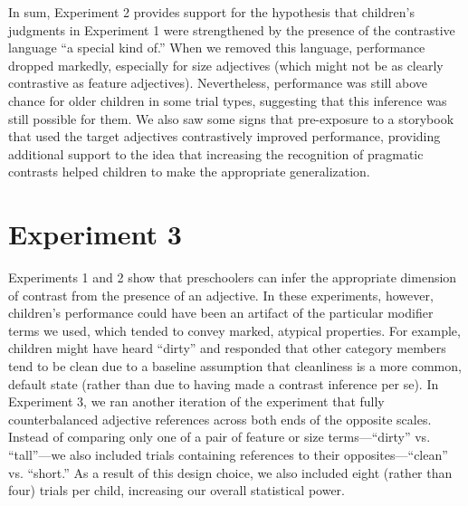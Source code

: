 \documentclass[man]{apa2}
\begin{document}

In sum, Experiment 2 provides support for the hypothesis that children's judgments in Experiment 1 were strengthened by the presence of the contrastive language ``a special kind of.'' When we removed this language, performance dropped markedly, especially for size adjectives (which might not be as clearly contrastive as feature adjectives). Nevertheless, performance was still above chance for older children in some trial types, suggesting that this inference was still possible for them.  We also saw some signs that pre-exposure to a storybook that used the target adjectives contrastively improved performance, providing additional support to the idea that increasing the recognition of pragmatic contrasts helped children to make the appropriate generalization. 




\section{Experiment 3} 

Experiments 1 and 2 show that preschoolers can infer the appropriate dimension of contrast from the presence of an adjective. In these experiments, however, children's performance could have been an artifact of the particular modifier terms we used, which tended to convey marked, atypical properties. For example, children might have heard ``dirty'' and responded that other category members tend to be clean due to a baseline assumption that cleanliness is a more common, default state (rather than due to having made a contrast inference per se). In Experiment 3, we ran another iteration of the experiment that fully counterbalanced adjective references across both ends of the opposite scales. Instead of comparing only one of a pair of feature or size terms---``dirty'' vs. ``tall''---we also included trials containing references to their opposites---``clean'' vs. ``short.''  As a result of this design choice, we also included eight (rather than four) trials per child, increasing our overall statistical power.
\end{document}
